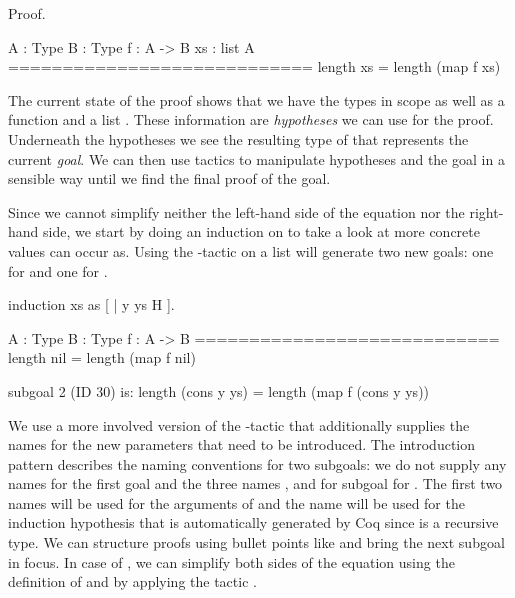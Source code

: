 \begin{cproof}
\begin{miniMinted}
Proof.
\end{miniMinted}
\begin{miniVerb}
  A : Type
  B : Type
  f : A -> B
  xs : list A
  ============================
  length xs = length (map f xs)
\end{miniVerb}
\end{cproof}

The current state of the proof shows that we have the types  in scope as well as a function  and a list .
These information are \emph{hypotheses} we can use for the proof.
Underneath the hypotheses we see the resulting type of  that represents the current \emph{goal}.
We can then use tactics to manipulate hypotheses and the goal in a sensible way until we find the final proof of the goal.

Since we cannot simplify neither the left-hand side of the equation nor the right-hand side, we start by doing an induction on  to take a look at more concrete values  can occur as.
Using the -tactic on a list will generate two new goals: one for  and one for .

\begin{cproof}
\begin{miniMinted}
induction xs as [ | y ys H ].
\end{miniMinted}
\begin{miniVerb}
  A : Type
  B : Type
  f : A -> B
  ============================
  length nil = length (map f nil)

subgoal 2 (ID 30) is:
length (cons y ys) =
length (map f (cons y ys))
\end{miniVerb}
\end{cproof}

We use a more involved version of the -tactic that additionally supplies the names for the new parameters that need to be introduced.
The introduction pattern \cinl{[ | y ys H ]} describes the naming conventions for two subgoals: we do not supply any names for the first goal and the three names ,  and  for subgoal for .
The first two names will be used for the arguments of  and the name  will be used for the induction hypothesis that is automatically generated by Coq since  is a recursive type.
We can structure proofs using bullet points like \cinl{-,+,*} and bring the next subgoal in focus.
In case of , we can simplify both sides of the equation using the definition of  and  by applying the tactic .

